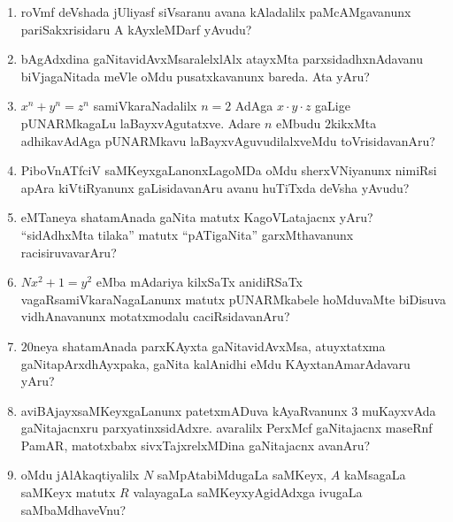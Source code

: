 \begin{enumerate}
\item roVmf deVshada jUliyasf siVsaranu avana kAladalilx paMcAMgavanunx pariSakxrisidaru A kAyxleMDarf yAvudu?

\item bAgAdxdina gaNitavidAvxMsaralelxlAlx atayxMta parxsidadhxnAdavanu biVjagaNitada meVle oMdu pusatxkavanunx bareda. Ata yAru?

\item $x^n+y^n=z^n$ samiVkaraNadalilx $n=2$ AdAga $x \cdot y \cdot z$ gaLige pUNARMkagaLu laBayxvAgutatxve. Adare $n$ eMbudu $2$kikxMta adhikavAdAga pUNARMkavu laBayxvAguvudilalxveMdu toVrisidavanAru?

\item PiboVnATfciV saMKeyxgaLanonxLagoMDa oMdu sherxVNiyanunx nimiRsi apAra kiVtiRyanunx gaLisidavanAru avanu huTiTxda deVsha yAvudu?

\item eMTaneya shatamAnada gaNita matutx  KagoVLatajacnx yAru? ``sidAdhxMta tilaka'' matutx ``pATigaNita'' garxMthavanunx racisiruvavarAru?

\item $Nx^2 +1=y^2$ eMba mAdariya kilxSaTx anidiRSaTx \hbox{vagaRsamiVkaraNagaLanunx} matutx pUNARMkabele hoMduvaMte biDisuva vidhAnavanunx motatxmodalu caciRsidavanAru?

\item $20$neya shatamAnada parxKAyxta gaNitavidAvxMsa, atuyxtatxma gaNitapArxdhAyxpaka, gaNita kalAnidhi eMdu KAyxtanAmarAdavaru yAru?

\item aviBAjayxsaMKeyxgaLanunx patetxmADuva kAyaRvanunx $3$ muKayxvAda gaNi\-tajacnxru parxyatinxsidAdxre. avaralilx PerxMcf gaNitajacnx maseRnf PamAR, matotxbabx sivxTajxrelxMDina gaNitajacnx avanAru?

\item oMdu jAlAkaqtiyalilx $N$ saMpAtabiMdugaLa saMKeyx, $A$ kaMsagaLa saMKeyx matutx $R$ valayagaLa saMKeyxyAgidAdxga ivugaLa saMbaMdhaveVnu?
  
\end{enumerate}
